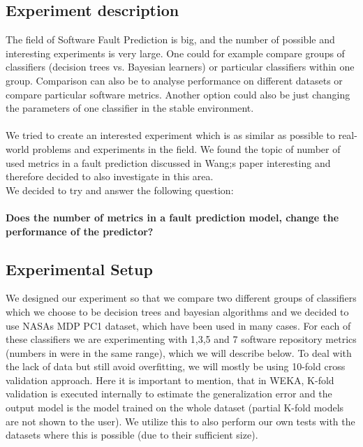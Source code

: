 \subsection{Experiment description}
The field of Software Fault Prediction is big, and the number of possible and interesting experiments is very large. One could for example compare groups of classifiers (decision trees vs. Bayesian learners) or particular classifiers within one group. Comparison can also be to analyse performance on different datasets or compare particular software metrics. Another option could also be just changing the parameters of one classifier in the stable environment.\\\\
We tried to create an interested experiment which is as similar as possible to real-world problems and experiments in the field. We found the topic of number of used metrics in a fault prediction discussed in Wang;s paper\cite{wang2011many} interesting and therefore decided to also investigate in this area. \\ We decided to try and answer the following question:\\\\
\textbf{Does the number of metrics in a fault prediction model, change the performance of the predictor?}\\
\subsection{Experimental Setup}
We designed our experiment so that we compare two different groups of classifiers which we choose to be decision trees and bayesian algorithms and we decided to use NASAs MDP PC1 dataset, which have been used in many cases. For each of these classifiers we are experimenting with 1,3,5 and 7 software repository metrics (numbers in \cite{wang2011many} were in the same range), which we will describe below. To deal with the lack of data but still avoid overfitting, we will mostly be using 10-fold cross validation approach. Here it is important to mention, that in WEKA, K-fold validation is executed internally to estimate the generalization error and the output model is the model trained on the whole dataset (partial K-fold models are not shown to the user). We utilize this to also perform our own tests with the datasets where this is possible (due to their sufficient size).
